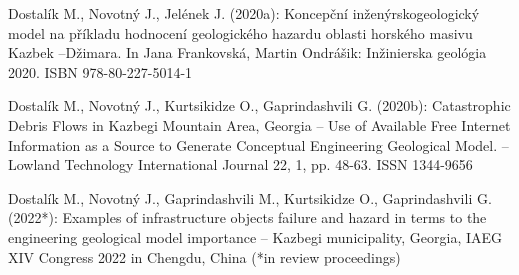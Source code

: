 {Dostalík M., Novotný J., Jelének J. (2020a): Koncepční inženýrskogeologický model na příkladu hodnocení geologického hazardu oblasti horského masivu Kazbek –Džimara. In Jana Frankovská, Martin Ondrášik: Inžinierska geológia 2020. ISBN 978-80-227-5014-1

Dostalík M., Novotný J., Kurtsikidze O., Gaprindashvili G. (2020b): Catastrophic Debris Flows in Kazbegi Mountain Area, Georgia – Use of Available Free Internet Information as a Source to Generate Conceptual Engineering Geological Model. – Lowland Technology International Journal 22, 1, pp. 48-63. ISSN 1344-9656
	
Dostalík M., Novotný J., Gaprindashvili M., Kurtsikidze O., Gaprindashvili G. (2022*): Examples of infrastructure objects failure and hazard in terms to the engineering geological model importance – Kazbegi municipality, Georgia, IAEG XIV Congress 2022 in Chengdu, China (*in review proceedings)
}



